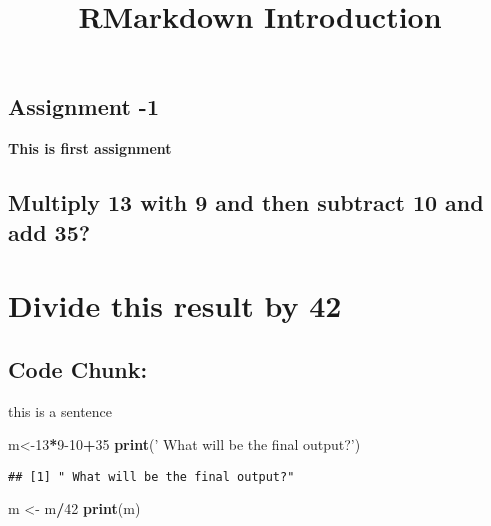 \documentclass[]{article}
\title{RMarkdown Introduction}
\author{}
\date{}
\newenvironment{Shaded}{\begin{snugshade}}{\end{snugshade}}
\newcommand{\DecValTok}[1]{\textcolor[rgb]{0.00,0.00,0.81}{#1}}
\newcommand{\KeywordTok}[1]{\textcolor[rgb]{0.13,0.29,0.53}{\textbf{#1}}}
\newcommand{\NormalTok}[1]{#1}
\newcommand{\OperatorTok}[1]{\textcolor[rgb]{0.81,0.36,0.00}{\textbf{#1}}}
\newcommand{\StringTok}[1]{\textcolor[rgb]{0.31,0.60,0.02}{#1}}
\begin{document}
\maketitle

{
\setcounter{tocdepth}{2}
\tableofcontents
}
\hypertarget{assignment--1}{%
\subsection{Assignment -1}\label{assignment--1}}

\textbf{This is first assignment }

\hypertarget{multiply-13-with-9-and-then-subtract-10-and-add-35}{%
\subsection{Multiply 13 with 9 and then subtract 10 and add
35?}\label{multiply-13-with-9-and-then-subtract-10-and-add-35}}

\hypertarget{divide-this-result-by-42}{%
\section{Divide this result by 42}\label{divide-this-result-by-42}}

\hypertarget{code-chunk}{%
\subsection{Code Chunk:}\label{code-chunk}}

this is a sentence

\begin{Shaded}
\begin{Highlighting}[]
\NormalTok{m<-}\DecValTok{13}\OperatorTok{*}\DecValTok{9-10}\OperatorTok{+}\DecValTok{35}
\KeywordTok{print}\NormalTok{(}\StringTok{' What will be the final output?'}\NormalTok{)}
\end{Highlighting}
\end{Shaded}

\begin{verbatim}
## [1] " What will be the final output?"
\end{verbatim}

\begin{Shaded}
\begin{Highlighting}[]
\NormalTok{m <-}\StringTok{ }\NormalTok{m}\OperatorTok{/}\DecValTok{42}
\KeywordTok{print}\NormalTok{(m)}
\end{Highlighting}
\end{Shaded}
\end{document}
